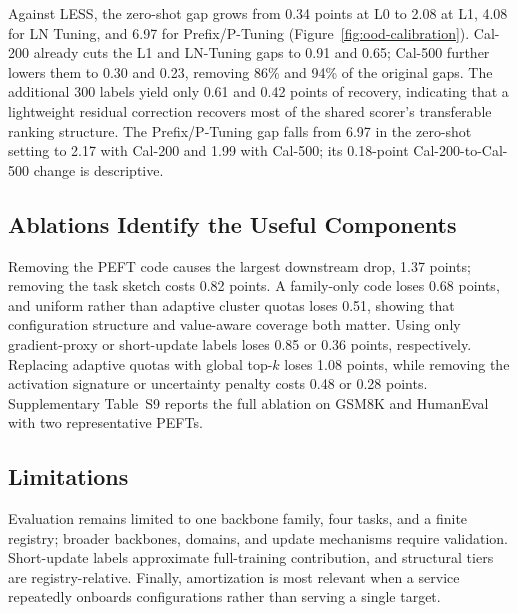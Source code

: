 Against LESS, the zero-shot gap grows from 0.34 points at L0 to 2.08 at L1, 4.08 for LN Tuning, and 6.97 for Prefix/P-Tuning (Figure~\ref{fig:ood-calibration}). Cal-200 already cuts the L1 and LN-Tuning gaps to 0.91 and 0.65; Cal-500 further lowers them to 0.30 and 0.23, removing 86\% and 94\% of the original gaps. The additional 300 labels yield only 0.61 and 0.42 points of recovery, indicating that a lightweight residual correction recovers most of the shared scorer's transferable ranking structure. The Prefix/P-Tuning gap falls from 6.97 in the zero-shot setting to 2.17 with Cal-200 and 1.99 with Cal-500; its 0.18-point Cal-200-to-Cal-500 change is descriptive.

\subsection{Ablations Identify the Useful Components}
\label{sec:ablation}

Removing the PEFT code causes the largest downstream drop, 1.37 points; removing the task sketch costs 0.82 points. A family-only code loses 0.68 points, and uniform rather than adaptive cluster quotas loses 0.51, showing that configuration structure and value-aware coverage both matter. Using only gradient-proxy or short-update labels loses 0.85 or 0.36 points, respectively. Replacing adaptive quotas with global top-$k$ loses 1.08 points, while removing the activation signature or uncertainty penalty costs 0.48 or 0.28 points. Supplementary Table~S9 reports the full ablation on GSM8K and HumanEval with two representative PEFTs.

\subsection{Limitations}

Evaluation remains limited to one backbone family, four tasks, and a finite registry; broader backbones, domains, and update mechanisms require validation. Short-update labels approximate full-training contribution, and structural tiers are registry-relative. Finally, amortization is most relevant when a service repeatedly onboards configurations rather than serving a single target.

